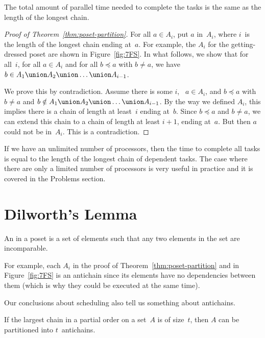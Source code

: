 \begin{corollary}
The total amount of parallel time needed to complete the tasks is the
same as the length of the longest chain.
\end{corollary}

\begin{proof}[Proof of Theorem~\ref{thm:poset-partition}]
For all $a \in A_i$, put $a$ in~$A_i$, where $i$~is the length of the
longest chain ending at~$a$.  For example, the $A_i$ for the
getting-dressed poset are shown in Figure~\ref{fig:7FS}.  In what
follows, we show that for all~$i$, for all $a \in A_i$ and for all $b
\preceq a$ with $b \ne a$, we have $b \in A_1 \union A_2 \union \dots
\union A_{i - 1}$.

We prove this by contradiction.  Assume there is some $i$, \ $a \in
A_i$, and $b \preceq a$ with $b \ne a$ and $b \notin A_1 \union A_2
\union \dots \union A_{i - 1}$.  By the way we defined $A_i$, this
implies there is a chain of length at least~$i$ ending at~$b$.  Since
$b \preceq a$ and $b \ne a$, we can extend this chain to a chain of
length at least $i + 1$, ending at~$a$.  But then $a$ could not be
in~$A_i$.  This is a contradiction.
\end{proof}

If we have an unlimited number of processors, then the time to
complete all tasks is equal to the length of the longest chain of
dependent tasks.  The case where there are only a limited number of
processors is very useful in practice and it is covered in the
Problems section.


\section{Dilworth's Lemma}\label{sec:dilworth}

\begin{definition}\label{def:antichain}
An  in a poset is a set of elements such that
any two elements in the set are incomparable.
\end{definition}

For example, each $A_i$ in the proof of
Theorem~\ref{thm:poset-partition} and in Figure~\ref{fig:7FS} is an
antichain since its elements have no dependencies between them (which
is why they could be executed at the same time).

Our conclusions about scheduling also tell us something about
antichains.

\begin{corollary}\label{cor:antichains}
If the largest chain in a partial order on a set~$A$ is of size~$t$,
then $A$ can be partitioned into $t$~antichains.
\end{corollary}

